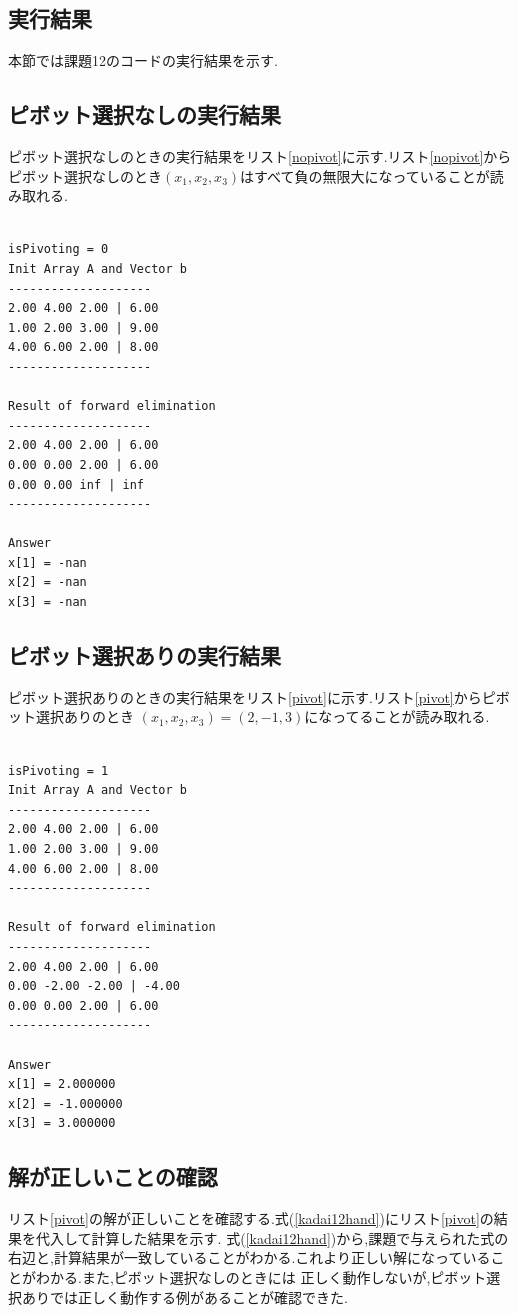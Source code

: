 \documentclass[a4j]{jarticle}
\begin{document}
      \subsection{実行結果}
      本節では課題12のコードの実行結果を示す.
      \subsection{ピボット選択なしの実行結果}
      ピボット選択なしのときの実行結果をリスト\ref{nopivot}に示す.リスト\ref{nopivot}から
      ピボット選択なしのとき$(x_1,x_2,x_3)$はすべて負の無限大になっていることが読み取れる.
      \begin{lstlisting}[basicstyle=\ttfamily\footnotesize, frame=single,label=nopivot,caption=ピボット選択なしのときの実行結果]

isPivoting = 0
Init Array A and Vector b
--------------------
2.00 4.00 2.00 | 6.00
1.00 2.00 3.00 | 9.00
4.00 6.00 2.00 | 8.00
--------------------

Result of forward elimination
--------------------
2.00 4.00 2.00 | 6.00
0.00 0.00 2.00 | 6.00
0.00 0.00 inf | inf
--------------------

Answer
x[1] = -nan
x[2] = -nan
x[3] = -nan

      \end{lstlisting}

      \subsection{ピボット選択ありの実行結果}
      ピボット選択ありのときの実行結果をリスト\ref{pivot}に示す.リスト\ref{pivot}からピボット選択ありのとき
      $(x_1,x_2,x_3)=(2,-1,3)$になってることが読み取れる.
      \begin{lstlisting}[basicstyle=\ttfamily\footnotesize, frame=single,label=pivot,caption=ピボット選択ありのときの実行結果]

isPivoting = 1
Init Array A and Vector b
--------------------
2.00 4.00 2.00 | 6.00
1.00 2.00 3.00 | 9.00
4.00 6.00 2.00 | 8.00
--------------------

Result of forward elimination
--------------------
2.00 4.00 2.00 | 6.00
0.00 -2.00 -2.00 | -4.00
0.00 0.00 2.00 | 6.00
--------------------

Answer
x[1] = 2.000000
x[2] = -1.000000
x[3] = 3.000000

      \end{lstlisting}

      \subsection{解が正しいことの確認}
      リスト\ref{pivot}の解が正しいことを確認する.式(\ref{kadai12hand})にリスト\ref{pivot}の結果を代入して計算した結果を示す.
      式(\ref{kadai12hand})から,課題で与えられた式の右辺と,計算結果が一致していることがわかる.これより正しい解になっていることがわかる.また,ピボット選択なしのときには
      正しく動作しないが,ピボット選択ありでは正しく動作する例があることが確認できた.
\end{document}
